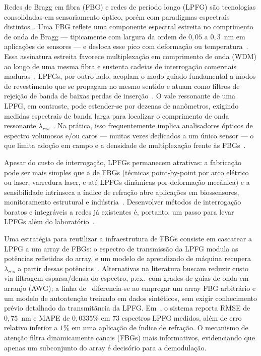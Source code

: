 \documentclass[conference]{IEEEtran}
\begin{document}
Redes de Bragg em fibra (FBG) e redes de período longo (LPFG) são tecnologias consolidadas em sensoriamento óptico, porém com paradigmas espectrais distintos~\cite{Kersey1997FBG,James1996LPFG}.
Uma FBG reflete uma componente espectral estreita no comprimento de onda de Bragg --- tipicamente com largura da ordem de $0{,}05$ a $0{,}3$~nm em aplicações de sensores --- e desloca esse pico com deformação ou temperatura~\cite{Kersey1997FBG}.
Essa assinatura estreita favorece multiplexação em comprimento de onda (WDM) ao longo de uma mesma fibra e sustenta cadeias de interrogação comerciais maduras~\cite{Kersey1997FBG}.
LPFGs, por outro lado, acoplam o modo guiado fundamental a modos de revestimento que se propagam no mesmo sentido e atuam como filtros de rejeição de banda de baixas perdas de inserção~\cite{James1996LPFG}.
O vale ressonante de uma LPFG, em contraste, pode estender-se por dezenas de nanômetros, exigindo medidas espectrais de banda larga para localizar o comprimento de onda ressonante $\lambda_{res}$~\cite{Barino2025TIM}.
Na prática, isso frequentemente implica analisadores ópticos de espectro volumosos e/ou caros --- muitas vezes dedicados a um único sensor --- o que limita adoção em campo e a densidade de multiplexação frente às FBGs~\cite{Barino2025TIM}.

Apesar do custo de interrogação, LPFGs permanecem atrativas: a fabricação pode ser mais simples que a de FBGs (técnicas point-by-point por arco elétrico ou laser, varredura laser, e até LPFGs dinâmicas por deformação mecânica) e a sensibilidade intrínseca a índice de refração abre aplicações em biossensores, monitoramento estrutural e indústria~\cite{Barino2025TIM}.
Desenvolver métodos de interrogação baratos e integráveis a redes já existentes é, portanto, um passo para levar LPFGs além do laboratório~\cite{Barino2025TIM}.

Uma estratégia para reutilizar a infraestrutura de FBGs consiste em cascatear a LPFG a um array de FBGs: o espectro de transmissão da LPFG modula as potências refletidas do array, e um modelo de aprendizado de máquina recupera $\lambda_{res}$ a partir dessas potências~\cite{Barino2020Sensors,Barino2024LAWOFS,Barino2025TIM}.
Alternativas na literatura buscam reduzir custo via filtragem esparsa/densa do espectro, p.ex.\ com grades de guias de onda em arranjo (AWG); a linha de~\cite{Barino2025TIM} diferencia-se ao empregar um array FBG arbitrário e um modelo de autoatenção treinado em dados sintéticos, sem exigir conhecimento prévio detalhado da transmitância da LPFG.
Em~\cite{Barino2025TIM}, o sistema reporta RMSE de $0{,}75$~nm e MAPE de $0{,}0335\%$ em $73$ espectros LPFG medidos, além de erro relativo inferior a $1\%$ em uma aplicação de índice de refração.
O mecanismo de atenção filtra dinamicamente canais (FBGs) mais informativos, evidenciando que apenas um subconjunto do array é decisório para a demodulação.
\end{document}
